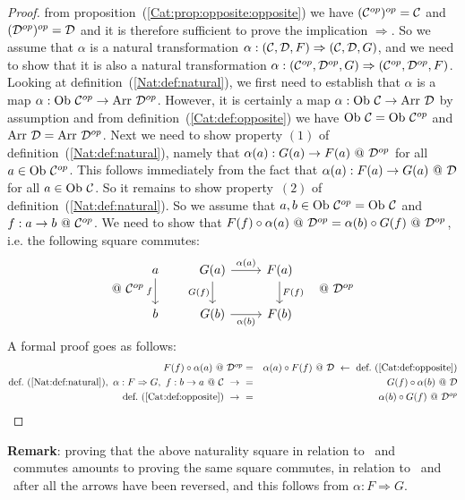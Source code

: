 \begin{proof}
    from proposition~(\ref{Cat:prop:opposite:opposite}) we have
    $(\mbox{${\cal C}^{op}$})^{op}=\mbox{$\cal C$}$ and $(\mbox{${\cal D}^{op}$})^{op}=\mbox{$\cal D$}$ and it is therefore sufficient 
    to prove the implication $\Rightarrow$. So we assume that $\alpha$ is 
    a natural transformation $\alpha:(\mbox{$\cal C$},\mbox{$\cal D$},F)\Rightarrow(\mbox{$\cal C$},\mbox{$\cal D$},G)$,
    and we need to show that it is also a natural transformation
    $\alpha:(\mbox{${\cal C}^{op}$},\mbox{${\cal D}^{op}$},G)\Rightarrow(\mbox{${\cal C}^{op}$},\mbox{${\cal D}^{op}$},F)$. Looking at 
    definition~(\ref{Nat:def:natural}), we first need to establish that
    $\alpha$ is a map $\alpha:\ob\ \Cop\to\arr\ \Dop$. However, it is 
    certainly a map $\alpha:\mbox{\rm Ob}\ \mbox{$\cal C$}\to\mbox{\rm Arr}\ \mbox{$\cal D$}$ by assumption and from 
    definition~(\ref{Cat:def:opposite}) we have $\mbox{\rm Ob}\ \mbox{$\cal C$}=\mbox{\rm Ob}\ \mbox{${\cal C}^{op}$}$ and
    $\mbox{\rm Arr}\ \mbox{$\cal D$}=\mbox{\rm Arr}\ \mbox{${\cal D}^{op}$}$. Next we need to show property $(1)$ of
    definition~(\ref{Nat:def:natural}), namely that 
    $\alpha(a):G(a)\to F(a)\ @\ \mbox{${\cal D}^{op}$}$ for all $a\in\mbox{\rm Ob}\ \mbox{${\cal C}^{op}$}$. This
    follows immediately from the fact that $\alpha(a):F(a)\to G(a)\ @\ \mbox{$\cal D$}$
    for all $a\in\mbox{\rm Ob}\ \mbox{$\cal C$}$. So it remains to show property~$(2)$ of 
    definition~(\ref{Nat:def:natural}). So we assume that $a,b\in\mbox{\rm Ob}\ \mbox{${\cal C}^{op}$}
    =\mbox{\rm Ob}\ \mbox{$\cal C$}$ and $f:a\to b\ @\ \Cop$. We need to show that 
    $F(f)\circ\alpha(a)\ @\ \Dop = \alpha(b)\circ G(f)\ @\ \Dop$, i.e.
    the following square commutes:
    \begin{eqnarray*}@\ \Cop
        &\begin{tikzcd}
            a\arrow[d,swap, "f"]
            &G(a)\arrow[r, "\alpha(a)"]\arrow[d, swap,"G(f)"]
            &F(a)\arrow[d, "F(f)"]
            \\
            b
            &G(b)\arrow[r, swap, "\alpha(b)"]
            &F(b)
        \end{tikzcd}&@\ \Dop
    \end{eqnarray*}
    A formal proof goes as follows:
    \begin{eqnarray*}F(f)\circ\alpha(a)\ @\ \Dop 
        &=&\alpha(a)\circ F(f)\ @\ \Dat
        \ \leftarrow\ \mbox{def.~(\ref{Cat:def:opposite})}\\
        \mbox{def.~(\ref{Nat:def:natural})},\ 
        \alpha:F\Rightarrow G,\ f:b\to a\ @\ \Cat\ \to\ 
        &=&G(f)\circ\alpha(b)\ @\ \Dat\\
        \mbox{def.~(\ref{Cat:def:opposite})}\ \to\ 
        &=&\alpha(b)\circ G(f)\ @\ \Dop
    \end{eqnarray*}
\end{proof}

\noindent
{\bf Remark}: proving that the above naturality square in relation to \Cop\ and
\Dop\ commutes amounts to proving the same square commutes, in relation to \Cat\ 
and \Dat\ after all the arrows have been reversed, and this follows from 
$\alpha:F\Rightarrow G$.


